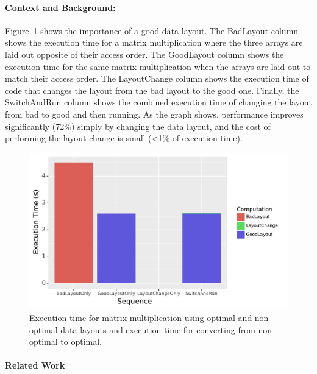 \documentclass{article}
\begin{document}
\paragraph{Context and Background:}

Figure~\ref{DataLayoutImportance} shows the importance of a good data layout. 
The BadLayout column shows the execution time for a matrix multiplication where the three arrays are laid out opposite of their access order. 
The GoodLayout column shows the execution time for the same matrix multiplication when the arrays are laid out to match their access order.
The LayoutChange column shows the execution time of code that changes the layout from the bad layout to the good one.
Finally, the SwitchAndRun column shows the combined execution time of changing the layout from bad to good and then running.
As the graph shows, performance improves  significantly (72\%) simply by changing the data layout, and the cost of performing the layout change is small (<1\% of execution time). 


\begin{figure}
	\includegraphics[width=\columnwidth]{IntroExampleGraph.pdf}
	\caption{Execution time for matrix multiplication using optimal and non-optimal data layouts and execution time for converting from non-optimal to optimal.}
	\label{DataLayoutImportance}
\end{figure}

\paragraph{Related Work}
\end{document}
